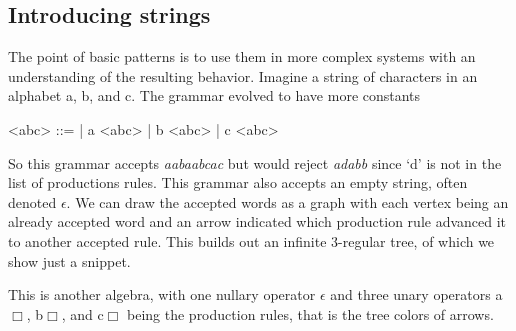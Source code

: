 \subsection{Introducing strings}
The point of basic patterns is to use them in more complex systems
with an understanding of the resulting behavior.  Imagine a string 
of characters in an alphabet a, b, and c.  The grammar evolved to 
have more constants 
\begin{center}
\begin{Gcode}[]
<abc> ::=  
       | a <abc> 
       | b <abc>
       | c <abc> 
\end{Gcode}
\end{center}
So this grammar accepts \emph{aabaabcac} 
but would reject \emph{adabb} since `d' is not in the list of productions 
rules.  This grammar also accepts an empty string, often denoted 
$\epsilon$.  We can draw the accepted words as a graph with each vertex 
being an already accepted word and an arrow indicated which production rule 
advanced it to another accepted rule.  This builds out an infinite 
3-regular tree, of which we show just a snippet.
\begin{center}
\end{center}
This is another algebra, with one nullary operator 
$\epsilon$ and three unary operators {\color{BrickRed}a$\Box$}, 
{\color{PineGreen}b$\Box$}, and {\color{RoyalBlue}c$\Box$}
being the production rules, that is the tree colors of arrows.

